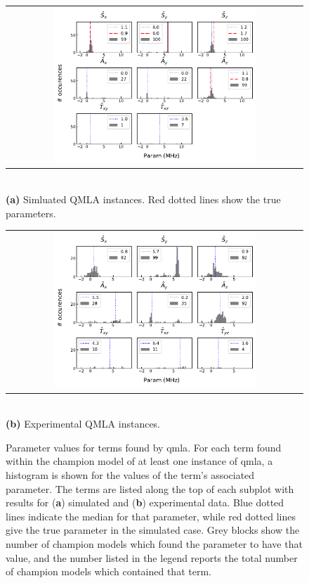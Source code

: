 \begin{figure}
    \centering
    \begin{tabular}{@{}c@{}}
        \centering
        \includegraphics[width=0.7\textwidth]{experimental_study/figures/params_simulation.pdf}
    \end{tabular}
    \\ \small \textbf{(a)} Simluated QMLA instances. Red dotted lines show the true parameters.
    
    \centering
    \begin{tabular}{@{}c@{}}
        \centering
        \includegraphics[width=0.7\textwidth]{experimental_study/figures/params_experimental.pdf}
    \end{tabular}
    \\
    \small \textbf{(b)} Experimental QMLA instances.
    \caption[
        Histograms for parameters learned by QMLA champion models on simulated and experimental data
    ]{
        Parameter values for terms found by \gls{qmla}. 
        For each term found within the \gls{champion model} of at least one \gls{instance} of \gls{qmla}, 
            a histogram is shown for the values of the term's associated parameter.
        The terms are listed along the top of each subplot with results for (\textbf{a}) simulated  and (\textbf{b}) experimental data. 
        Blue dotted lines indicate the median for that parameter, while red dotted lines give the true parameter in the simulated case. 
        Grey blocks show the number of champion models which found the parameter to have that value,
        and the number listed in the legend reports the total number of \glspl{champion model} which contained that term.
        \figtableref
    }
    \label{fig:nv_learned_params}
\end{figure}


